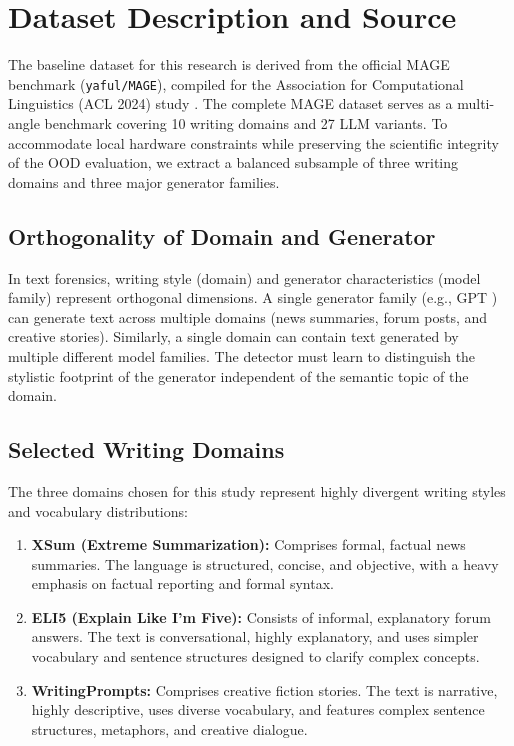 \section{Dataset Description and Source}\label{Chapter-2-Dataset}
\noindent The baseline dataset for this research is derived from the official MAGE benchmark (\texttt{yaful/MAGE}), compiled for the Association for Computational Linguistics (ACL 2024) study \cite{li-etal-2024-mage}. The complete MAGE dataset serves as a multi-angle benchmark covering 10 writing domains and 27 LLM variants. To accommodate local hardware constraints while preserving the scientific integrity of the OOD evaluation, we extract a balanced subsample of three writing domains and three major generator families.

\subsection{Orthogonality of Domain and Generator}
In text forensics, writing style (domain) and generator characteristics (model family) represent orthogonal dimensions. A single generator family (e.g., GPT \cite{brown2020language}) can generate text across multiple domains (news summaries, forum posts, and creative stories). Similarly, a single domain can contain text generated by multiple different model families. The detector must learn to distinguish the stylistic footprint of the generator independent of the semantic topic of the domain.

\subsection{Selected Writing Domains}
The three domains chosen for this study represent highly divergent writing styles and vocabulary distributions:
\begin{enumerate}
    \item \textbf{XSum (Extreme Summarization):} Comprises formal, factual news summaries. The language is structured, concise, and objective, with a heavy emphasis on factual reporting and formal syntax.
    \item \textbf{ELI5 (Explain Like I'm Five):} Consists of informal, explanatory forum answers. The text is conversational, highly explanatory, and uses simpler vocabulary and sentence structures designed to clarify complex concepts.
    \item \textbf{WritingPrompts:} Comprises creative fiction stories. The text is narrative, highly descriptive, uses diverse vocabulary, and features complex sentence structures, metaphors, and creative dialogue.
\end{enumerate}

